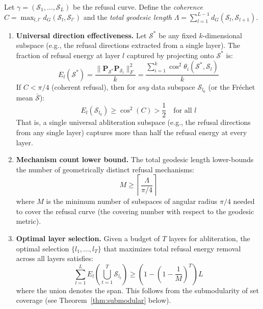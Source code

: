 \begin{theorem}
\label{thm:grassmannian}
Let $\gamma = (\mathcal{S}_1, \ldots, \mathcal{S}_L)$ be the refusal curve.
Define the \emph{coherence} $C = \max_{l, l'} d_G(\mathcal{S}_l, \mathcal{S}_{l'})$ and the \emph{total geodesic length} $\Lambda = \sum_{l=1}^{L-1} d_G(\mathcal{S}_l, \mathcal{S}_{l+1})$.

\begin{enumerate}[label=(\roman*)]
    \item \textbf{Universal direction effectiveness.}
    Let $\mathcal{S}^*$ be any fixed $k$-dimensional subspace (e.g., the refusal directions extracted from a single layer).
    The fraction of refusal energy at layer $l$ captured by projecting onto $\mathcal{S}^*$ is:
    \begin{equation}
        E_l(\mathcal{S}^*) = \frac{\|\mathbf{P}_{\mathcal{S}^*} \mathbf{P}_{\mathcal{S}_l}\|_F^2}{k} = \frac{\sum_{i=1}^k \cos^2\theta_i(\mathcal{S}^*, \mathcal{S}_l)}{k}
    \end{equation}
    If $C < \pi/4$ (coherent refusal), then for \emph{any} data subspace $\mathcal{S}_{l_0}$ (or the Fr\'echet mean $\bar{\mathcal{S}}$):
    \begin{equation}
        E_l(\mathcal{S}_{l_0}) \geq \cos^2(C) > \frac{1}{2} \quad \text{for all } l
    \end{equation}
    That is, a single universal abliteration subspace (e.g., the refusal directions from any single layer) captures more than half the refusal energy at every layer.

    \item \textbf{Mechanism count lower bound.}
    The total geodesic length lower-bounds the number of geometrically distinct refusal mechanisms:
    \begin{equation}
        M \geq \left\lceil \frac{\Lambda}{\pi/4} \right\rceil
    \end{equation}
    where $M$ is the minimum number of subspaces of angular radius $\pi/4$ needed to cover the refusal curve (the covering number with respect to the geodesic metric).

    \item \textbf{Optimal layer selection.}
    Given a budget of $T$ layers for abliteration, the optimal selection $\{l_1, \ldots, l_T\}$ that maximizes total refusal energy removal across all layers satisfies:
    \begin{equation}
        \sum_{l=1}^L E_l\!\left(\bigcup_{t=1}^T \mathcal{S}_{l_t}\right) \geq \left(1 - \left(1 - \frac{1}{M}\right)^T\right) L
    \end{equation}
    where the union denotes the span. This follows from the submodularity of set coverage (see Theorem~\ref{thm:submodular} below).
\end{enumerate}
\end{theorem}

